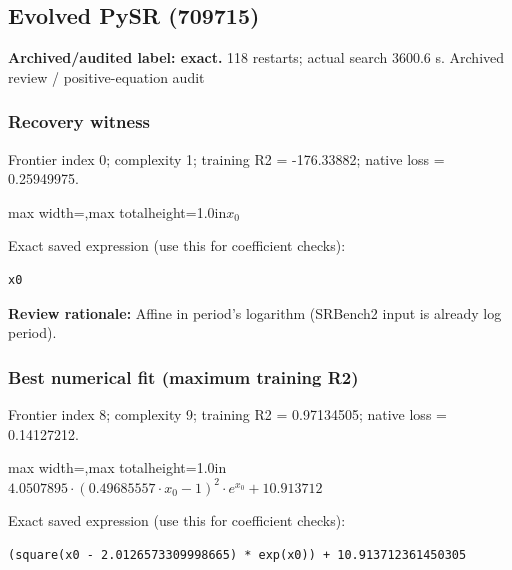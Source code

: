 \documentclass[10pt,letterpaper,landscape]{article}
\begin{document}
\begin{minipage}[t]{0.485\textwidth}
\subsection*{Evolved PySR (709715)}
\textbf{Archived/audited label: exact.} 118 restarts; actual search 3600.6 s.
{\small Archived review / positive-equation audit}
\subsubsection*{Recovery witness}
Frontier index 0; complexity 1; training R2 = -176.33882; native loss = 0.25949975.
\begin{center}\begin{adjustbox}{max width=\linewidth,max totalheight=1.0in}$\displaystyle x_{0}$\end{adjustbox}\end{center}
{\scriptsize Exact saved expression (use this for coefficient checks):}
\begin{lstlisting}
x0
\end{lstlisting}
{\small\textbf{Review rationale:} Affine in period's logarithm (SRBench2 input is already log period).}
\subsubsection*{Best numerical fit (maximum training R2)}
Frontier index 8; complexity 9; training R2 = 0.97134505; native loss = 0.14127212.
\begin{center}\begin{adjustbox}{max width=\linewidth,max totalheight=1.0in}$\displaystyle 4.0507895 \cdot \left(0.49685557 \cdot x_{0} - 1\right)^{2} \cdot e^{x_{0}} + 10.913712$\end{adjustbox}\end{center}
{\scriptsize Exact saved expression (use this for coefficient checks):}
\begin{lstlisting}
(square(x0 - 2.0126573309998665) * exp(x0)) + 10.913712361450305
\end{lstlisting}
\end{minipage}
\clearpage{}\label{leavitt-10002}
\end{document}
